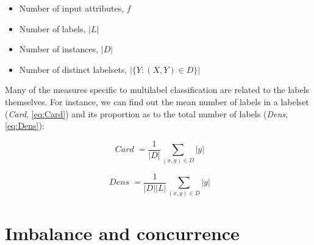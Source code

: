 \documentclass[]{article}
\newcommand{\func}[1]{\operatorname{\mathit{#1}}} \newcommand{\const}[1]{\mathit{#1}} \newcommand{\abs}[1]{\left\lvert{#1}\right\rvert}
\begin{document}
\begin{itemize}
\itemsep1pt\parskip0pt
\item
  Number of input attributes, \(f\)
\item
  Number of labels, \(\abs L\)
\item
  Number of instances, \(\abs D\)
\item
  Number of distinct labelsets, \(\abs{\{Y:(X, Y)\in D\}}\)
\end{itemize}

Many of the measures specific to multilabel classification are related
to the labels themselves. For instance, we can find out the mean number
of labels in a labelset (\emph{Card}, \ref{eq:Card}) and its proportion
as to the total number of labels (\emph{Dens}, \ref{eq:Dens}):

\begin{equation} \func{Card} = \frac 1 {\abs D} \sum_{(x,y)\in D} \abs y \label{eq:Card}\end{equation}

\begin{equation} \func{Dens} = \frac 1 {\abs D \abs L} \sum_{(x,y)\in D} \abs y \label{eq:Dens}\end{equation}

\section{Imbalance and concurrence}\label{imbalance-and-concurrence}
\end{document}
